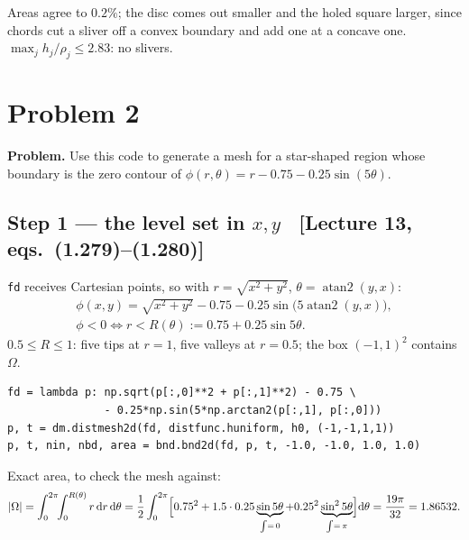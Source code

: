 \documentclass[11pt]{article}
\newcommand{\abs}[1]{\lvert #1\rvert}
\newcommand{\Om}{\Omega}
\newcommand{\src}[1]{{\small\color{black!55}\textsf{[#1]}}}
\newcommand{\problem}[2]{%
  \section*{Problem #1}%
  \renewcommand{\theequation}{#2.\arabic{equation}}%
  \setcounter{equation}{0}}
\begin{document}
\begin{steps}
\item Areas agree to $0.2\%$; the disc comes out smaller and the holed
      square larger, since chords cut a sliver off a convex boundary and add
      one at a concave one.  $\max_j h_j/\rho_j\le2.83$: no slivers.
\end{steps}

\problem{2}{2}

\textbf{Problem.} Use this code to generate a mesh for a star-shaped region
whose boundary is the zero contour of $\phi(r,\theta)=r-0.75-0.25\sin(5\theta)$.

\subsection*{Step 1 --- the level set in $x,y$
  \ \src{Lecture 13, eqs.~(1.279)--(1.280)}}

\begin{steps}
\item \texttt{fd} receives Cartesian points, so with $r=\sqrt{x^{2}+y^{2}}$,
      $\theta=\operatorname{atan2}(y,x)$:
\begin{equation}\label{eq:phi}
  \begin{gathered}
  \phi(x,y)=\sqrt{x^{2}+y^{2}}-0.75-0.25\sin\bigl(5\operatorname{atan2}(y,x)\bigr),\\
  \phi<0\iff r<R(\theta):=0.75+0.25\sin5\theta .
  \end{gathered}
\end{equation}
      $0.5\le R\le1$: five tips at $r=1$, five valleys at $r=0.5$; the box
      $(-1,1)^{2}$ contains $\Om$.
\begin{Verbatim}[fontsize=\small,xleftmargin=1em]
fd = lambda p: np.sqrt(p[:,0]**2 + p[:,1]**2) - 0.75 \
               - 0.25*np.sin(5*np.arctan2(p[:,1], p[:,0]))
p, t = dm.distmesh2d(fd, distfunc.huniform, h0, (-1,-1,1,1))
p, t, nin, nbd, area = bnd.bnd2d(fd, p, t, -1.0, -1.0, 1.0, 1.0)
\end{Verbatim}
\item Exact area, to check the mesh against:
\begin{equation}\label{eq:area}
  \abs{\Om}=\int_{0}^{2\pi}\!\!\int_{0}^{R(\theta)}r\,\mathrm{d}r\,\mathrm{d}\theta
  =\frac12\int_{0}^{2\pi}\Bigl[0.75^{2}+1.5\cdot0.25\underbrace{\sin5\theta}_{\int=\,0}
   +0.25^{2}\underbrace{\sin^{2}5\theta}_{\int=\,\pi}\Bigr]\mathrm{d}\theta
  =\frac{19\pi}{32}=1.86532 .
\end{equation}
\end{steps}
\end{document}
